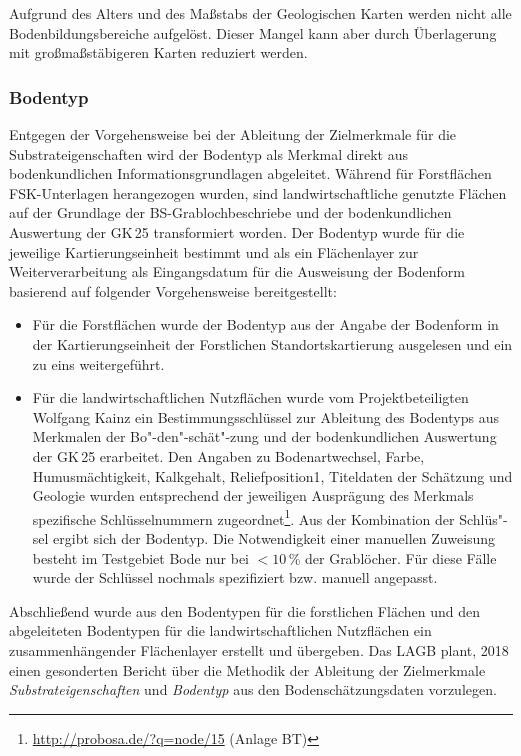 Aufgrund des Alters und des Maßstabs der Geologischen Karten werden nicht alle Bodenbildungsbereiche aufgelöst. Dieser Mangel kann aber durch Überlagerung mit großmaßstäbigeren Karten reduziert werden.

\subsubsection{Bodentyp}\label{sec:trans-bt}
Entgegen der Vorgehensweise bei der Ableitung der Zielmerkmale für die Substrateigenschaften wird der Bodentyp als Merkmal direkt aus bodenkundlichen Informationsgrundlagen abgeleitet. Während für  Forstflächen FSK-Unterlagen herangezogen wurden, sind landwirtschaftliche genutzte Flächen auf der Grundlage der  BS-Grablochbeschriebe und der bodenkundlichen Auswertung der GK\,25 transformiert worden. Der Bodentyp wurde für die jeweilige Kartierungseinheit bestimmt und als ein Flächenlayer zur Weiterverarbeitung als Eingangsdatum für die Ausweisung der Bodenform basierend auf folgender Vorgehensweise bereitgestellt:

\begin{itemize}
\item Für die Forstflächen wurde der Bodentyp aus der Angabe der Bodenform in der Kartierungseinheit der Forstlichen Standortskartierung ausgelesen und ein zu eins weitergeführt.
\item Für die landwirtschaftlichen Nutzflächen wurde vom Projektbeteiligten Wolfgang Kainz ein Bestimmungsschlüssel zur Ableitung des Bodentyps aus Merkmalen der Bo"-den"-schät"-zung und der bodenkundlichen Auswertung der GK\,25 erarbeitet. Den Angaben zu  Bodenartwechsel, Farbe, Humusmächtigkeit,  Kalkgehalt,  Reliefposition1,  Titeldaten der Schätzung und Geologie wurden entsprechend der jeweiligen Ausprägung des Merkmals spezifische Schlüsselnummern zugeordnet\footnote{\url{http://probosa.de/?q=node/15} (Anlage BT)}. Aus der Kombination der Schlüs"-sel ergibt sich der Bodentyp. Die Notwendigkeit einer manuellen Zuweisung besteht im Testgebiet Bode nur bei $< 10$\,\% der Grablöcher. Für diese Fälle wurde der Schlüssel nochmals spezifiziert bzw. manuell angepasst. 
\end{itemize}

Abschließend wurde aus den Bodentypen für die forstlichen Flächen und den abgeleiteten Bodentypen für die landwirtschaftlichen Nutzflächen ein zusammenhängender Flächenlayer erstellt und übergeben. Das LAGB plant, 2018 einen gesonderten Bericht über die Methodik der Ableitung der Zielmerkmale \textit{Substrateigenschaften} und \textit{Bodentyp} aus den Bodenschätzungsdaten vorzulegen.

